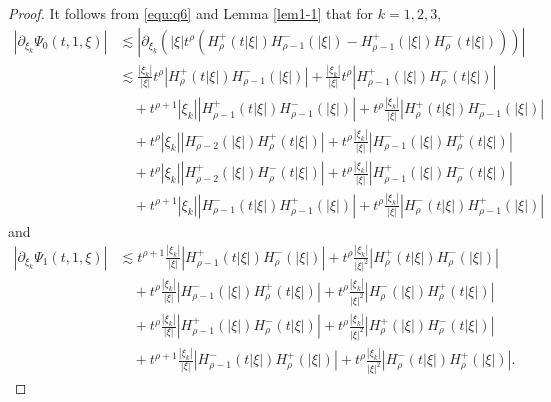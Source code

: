 \documentclass[10pt,a4paper]{amsart}
\newcommand{\f}{\frac}
\begin{document}
\begin{proof}
It follows from \eqref{equ:q6} and Lemma \ref{lem1-1}  that for $k=1,2,3$,
\begin{equation}\label{e:q36}
\begin{aligned}
\left| \partial_{\xi_k} \Psi_0(t, 1, \xi) \right|
&\lesssim \left| \partial_{\xi_k} \left( |\xi| t^\rho \left( H_\rho^+(t|\xi|) H_{\rho-1}^-(|\xi|)
- H_{\rho-1}^+(|\xi|) H_\rho^-(t|\xi|) \right) \right) \right| \\
&\lesssim \frac{|\xi_k|}{|\xi|} t^\rho \left| H_\rho^+(t|\xi|) H_{\rho-1}^-(|\xi|) \right|
+ \frac{|\xi_k|}{|\xi|} t^\rho \left| H_{\rho-1}^+(|\xi|) H_\rho^-(t|\xi|) \right| \\
&\quad + t^{\rho+1} |\xi_k| \left| H_{\rho-1}^+(t|\xi|) H_{\rho-1}^-(|\xi|) \right|
+ t^\rho \frac{|\xi_k|}{|\xi|} \left| H_\rho^+(t|\xi|) H_{\rho-1}^-(|\xi|) \right| \\
&\quad + t^\rho |\xi_k| \left| H_{\rho-2}^-(|\xi|) H_\rho^+(t|\xi|) \right|
+ t^\rho \frac{|\xi_k|}{|\xi|} \left| H_{\rho-1}^-(|\xi|) H_\rho^+(t|\xi|) \right| \\
&\quad + t^\rho |\xi_k| \left| H_{\rho-2}^+(|\xi|) H_\rho^-(t|\xi|) \right|
+ t^\rho \frac{|\xi_k|}{|\xi|} \left| H_{\rho-1}^+(|\xi|) H_\rho^-(t|\xi|) \right| \\
&\quad + t^{\rho+1} |\xi_k| \left| H_{\rho-1}^-(t|\xi|) H_{\rho-1}^+(|\xi|) \right|
+ t^\rho \frac{|\xi_k|}{|\xi|} \left| H_\rho^-(t|\xi|) H_{\rho-1}^+(|\xi|) \right|
\end{aligned}
\end{equation}
and
\begin{equation}\label{e:q37}
\begin{aligned}
\left| \partial_{\xi_k} \Psi_1(t, 1, \xi) \right|
&\lesssim  t^{\rho+1} \f{|\xi_k|}{|\xi|} \left| H_{\rho-1}^+(t|\xi|) H_{\rho}^-(|\xi|) \right|
+ t^\rho \frac{|\xi_k|}{|\xi|^2} \left| H_\rho^+(t|\xi|) H_{\rho}^-(|\xi|) \right| \\
&\quad + t^\rho \f{|\xi_k|}{|\xi|} \left| H_{\rho-1}^-(|\xi|) H_\rho^+(t|\xi|) \right|
+ t^\rho \frac{|\xi_k|}{|\xi|^2} \left| H_{\rho}^-(|\xi|) H_\rho^+(t|\xi|) \right| \\
&\quad + t^\rho \f{|\xi_k|}{|\xi|} \left| H_{\rho-1}^+(|\xi|) H_\rho^-(t|\xi|) \right|
+ t^\rho \frac{|\xi_k|}{|\xi|^2} \left| H_{\rho}^+(|\xi|) H_\rho^-(t|\xi|) \right| \\
&\quad + t^{\rho+1} \f{|\xi_k|}{|\xi|} \left| H_{\rho-1}^-(t|\xi|) H_{\rho}^+(|\xi|) \right|
+ t^\rho \frac{|\xi_k|}{|\xi|^2} \left| H_\rho^-(t|\xi|) H_{\rho}^+(|\xi|) \right|.
\end{aligned}

\end{equation}
\end{proof}
\end{document}
